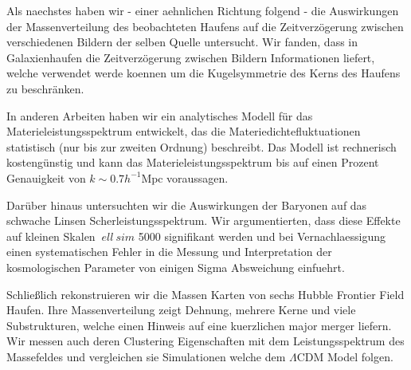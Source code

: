 Als naechstes haben wir - einer aehnlichen Richtung folgend - die Auswirkungen der Massenverteilung des beobachteten Haufens auf die Zeitverzögerung zwischen verschiedenen Bildern der selben Quelle untersucht.
Wir fanden, dass in Galaxienhaufen die Zeitverzögerung zwischen Bildern Informationen liefert, welche verwendet werde koennen um die Kugelsymmetrie des Kerns des Haufens zu beschränken.

In anderen Arbeiten haben wir ein analytisches Modell für das Materieleistungsspektrum entwickelt, das die Materiedichtefluktuationen statistisch (nur bis zur zweiten Ordnung) beschreibt.
Das Modell ist  rechnerisch kostengünstig und kann das Materieleistungsspektrum bis auf einen Prozent Genauigkeit von $k \sim 0.7 h^{- 1} \mathrm{Mpc}$ voraussagen.

Darüber hinaus untersuchten wir die Auswirkungen der Baryonen auf das schwache Linsen Scherleistungsspektrum. Wir argumentierten, dass diese Effekte auf kleinen Skalen $ \ ell \ sim $ 5000 signifikant werden und bei Vernachlaessigung einen systematischen Fehler in die Messung und Interpretation der kosmologischen Parameter von einigen Sigma Absweichung einfuehrt.

Schließlich rekonstruieren wir die Massen Karten von sechs Hubble Frontier Field Haufen. 
Ihre Massenverteilung zeigt Dehnung, mehrere Kerne und viele Substrukturen, welche einen Hinweis auf eine kuerzlichen major merger liefern.
Wir messen auch deren Clustering Eigenschaften mit dem Leistungsspektrum des Massefeldes und vergleichen sie Simulationen welche dem $\Lambda$CDM Model folgen.

